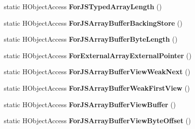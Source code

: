 \begin{DoxyCompactItemize}
\item 
\hypertarget{classv8_1_1internal_1_1_v8___f_i_n_a_l_a09708591626eff96d967ed00ada1061d}{}static H\+Object\+Access {\bfseries For\+J\+S\+Typed\+Array\+Length} ()\label{classv8_1_1internal_1_1_v8___f_i_n_a_l_a09708591626eff96d967ed00ada1061d}

\item 
\hypertarget{classv8_1_1internal_1_1_v8___f_i_n_a_l_aebc71962d27589af173989610938b297}{}static H\+Object\+Access {\bfseries For\+J\+S\+Array\+Buffer\+Backing\+Store} ()\label{classv8_1_1internal_1_1_v8___f_i_n_a_l_aebc71962d27589af173989610938b297}

\item 
\hypertarget{classv8_1_1internal_1_1_v8___f_i_n_a_l_acced6854b1dc9b72b0cd8d145316937c}{}static H\+Object\+Access {\bfseries For\+J\+S\+Array\+Buffer\+Byte\+Length} ()\label{classv8_1_1internal_1_1_v8___f_i_n_a_l_acced6854b1dc9b72b0cd8d145316937c}

\item 
\hypertarget{classv8_1_1internal_1_1_v8___f_i_n_a_l_a99b48b68f74f59df21af9b93f4e9257a}{}static H\+Object\+Access {\bfseries For\+External\+Array\+External\+Pointer} ()\label{classv8_1_1internal_1_1_v8___f_i_n_a_l_a99b48b68f74f59df21af9b93f4e9257a}

\item 
\hypertarget{classv8_1_1internal_1_1_v8___f_i_n_a_l_a678d57c5a75645bf794ceb21e87f7031}{}static H\+Object\+Access {\bfseries For\+J\+S\+Array\+Buffer\+View\+Weak\+Next} ()\label{classv8_1_1internal_1_1_v8___f_i_n_a_l_a678d57c5a75645bf794ceb21e87f7031}

\item 
\hypertarget{classv8_1_1internal_1_1_v8___f_i_n_a_l_a78322c6bc413542daed78620fa8690a3}{}static H\+Object\+Access {\bfseries For\+J\+S\+Array\+Buffer\+Weak\+First\+View} ()\label{classv8_1_1internal_1_1_v8___f_i_n_a_l_a78322c6bc413542daed78620fa8690a3}

\item 
\hypertarget{classv8_1_1internal_1_1_v8___f_i_n_a_l_a2e867b7be0ab7fe215f47825f18bdc6d}{}static H\+Object\+Access {\bfseries For\+J\+S\+Array\+Buffer\+View\+Buffer} ()\label{classv8_1_1internal_1_1_v8___f_i_n_a_l_a2e867b7be0ab7fe215f47825f18bdc6d}

\item 
\hypertarget{classv8_1_1internal_1_1_v8___f_i_n_a_l_a304278d7080b459a9c7775269776db91}{}static H\+Object\+Access {\bfseries For\+J\+S\+Array\+Buffer\+View\+Byte\+Offset} ()\label{classv8_1_1internal_1_1_v8___f_i_n_a_l_a304278d7080b459a9c7775269776db91}


\end{DoxyCompactItemize}
